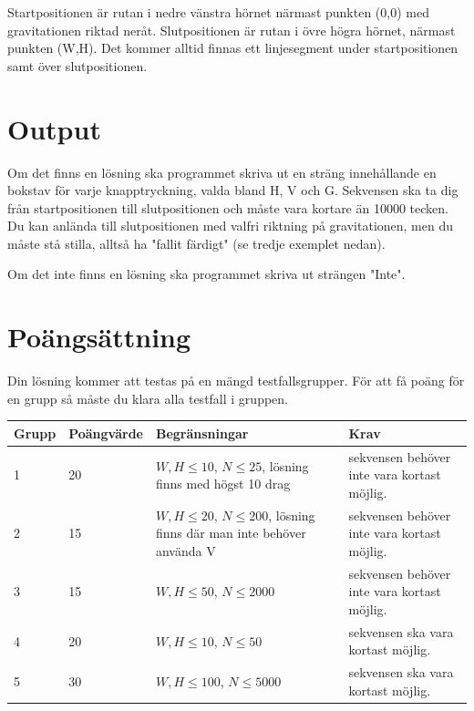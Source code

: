 Startpositionen är rutan i nedre vänstra hörnet närmast punkten (0,0) med gravitationen riktad neråt. Slutpositionen är rutan i övre högra hörnet, närmast punkten (W,H). Det kommer alltid finnas ett linjesegment under startpositionen samt över slutpositionen.


\section*{Output}

Om det finns en lösning ska programmet skriva ut en sträng innehållande en bokstav för varje knapptryckning, valda bland H, V och G. Sekvensen ska ta dig från startpositionen till slutpositionen och måste vara kortare än 10000 tecken. Du kan anlända till slutpositionen med valfri riktning på gravitationen, men du måste stå stilla, alltså ha "fallit färdigt" (se tredje exemplet nedan).

Om det inte finns en lösning ska programmet skriva ut strängen "Inte".

\section*{Poängsättning}
Din lösning kommer att testas på en mängd testfallsgrupper. För att få poäng för en grupp så måste du klara alla testfall i gruppen.

\begin{tabular}{| l | l | l | l |}
	\hline
	Grupp & Poängvärde & Begränsningar & Krav \\ \hline
  1     & 20  & $W,H \le 10$, $N \le 25$, lösning finns med högst 10 drag & sekvensen behöver inte vara kortast möjlig. \\ \hline
  2     & 15  & $W,H \le 20$, $N \le 200$, lösning finns där man inte behöver använda V & sekvensen behöver inte vara kortast möjlig. \\ \hline
  3     & 15  & $W,H \le 50$, $N \le 2000$ & sekvensen behöver inte vara kortast möjlig. \\ \hline
  4     & 20  & $W,H \le 10$, $N \le 50$ & sekvensen ska vara kortast möjlig. \\ \hline
  5     & 30  & $W,H \le 100$, $N \le 5000$ & sekvensen ska vara kortast möjlig. \\ \hline
\end{tabular}
